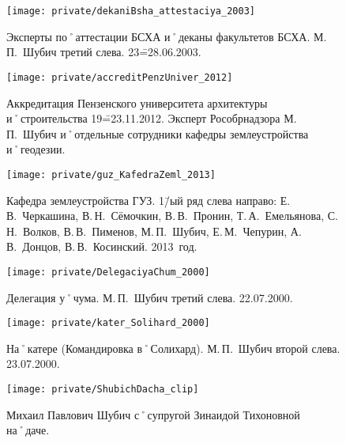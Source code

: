 \begin{figure}[h]
\texttt{[image: private/dekaniBsha\_attestaciya\_2003]}
\caption{Эксперты по˚аттестации БСХА и˚деканы факультетов БСХА. М.\,П.~Шубич третий слева. 23\==28.06.2003.}
\label{fig:dekaniBsha_attestaciya_2003}
\end{figure}



\begin{figure}[h]
\texttt{[image: private/accreditPenzUniver\_2012]}
\caption{Аккредитация Пензенского университета архитектуры и˚строительства 19\==23.11.2012. Эксперт Рособрнадзора М.\,П.~Шубич и˚отдельные сотрудники кафедры землеустройства и˚геодезии.}
\label{fig:accreditPenzUniver_2012}
\end{figure}


\begin{figure}[h]
\texttt{[image: private/guz\_KafedraZeml\_2013]}
\caption{Кафедра землеустройства ГУЗ. 1\=/ый ряд слева направо: Е.\,В.~Черкашина, В.\,Н.~Сёмочкин, В.\,В.~Пронин, Т.\,А.~Емельянова, С.\,Н.~Волков, В.\,В.~Пименов, М.\,П.~Шубич, Е.\,М.~Чепурин, А.\,В.~Донцов, В.\,В.~Косинский. 2013~год.}
\label{fig:guz_KafedraZeml_2013}
\end{figure}


\begin{figure}[h]
\texttt{[image: private/DelegaciyaChum\_2000]}
\caption{Делегация у˚чума. М.\,П.~Шубич третий слева. 22.07.2000.}
\label{fig:DelegaciyaChum_2000}
\end{figure}

\begin{figure}[h]
\texttt{[image: private/kater\_Solihard\_2000]}
\caption{На˚катере (Командировка в˚Солихард). М.\,П.~Шубич второй слева. 23.07.2000.}
\label{fig:kater_Solihard_2000}
\end{figure}

\begin{figure}[h]
\texttt{[image: private/ShubichDacha\_clip]}
\caption{Михаил Павлович Шубич с˚супругой Зинаидой Тихоновной на˚даче.}
\label{fig:ShubichDacha_clip}
\end{figure}


